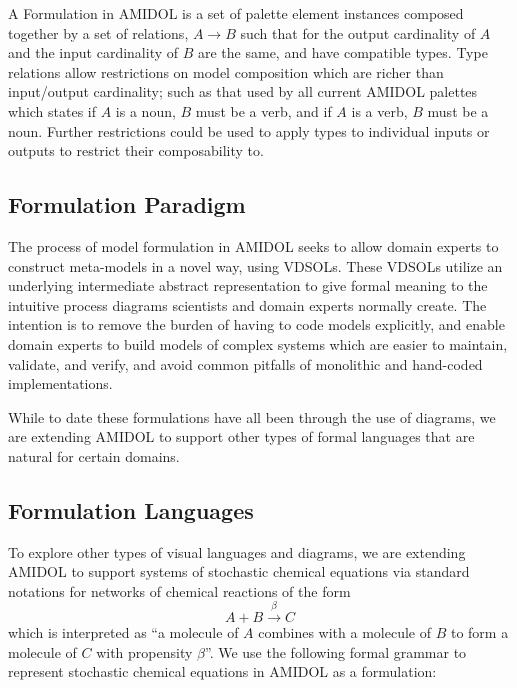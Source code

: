 \documentclass[11pt]{article}
\theoremstyle{definition}
\newcommand{\amidol}{\textsc{AMIDOL}}
\begin{document}
A Formulation in \amidol{} is a set of palette element instances
composed together by a set of relations, $A \rightarrow B$ such that
for the output cardinality of $A$ and the input cardinality of $B$ are
the same, and have compatible types.  Type relations allow
restrictions on model composition which are richer than input/output
cardinality; such as that used by all current \amidol{} palettes which
states if $A$ is a noun, $B$ must be a verb, and if $A$ is a verb, $B$
must be a noun.  Further restrictions could be used to apply types to
individual inputs or outputs to restrict their composability to.

\subsection{Formulation Paradigm}

The process of model formulation in \amidol{} seeks to allow domain
experts to construct meta-models in a novel way, using VDSOLs.  These
VDSOLs utilize an
underlying intermediate abstract representation to give formal meaning
to the intuitive process diagrams scientists and domain experts
normally create.  The intention is to remove the burden of having to
code models explicitly, and enable domain experts to build models of
complex systems which are easier to maintain, validate, and verify,
and avoid common pitfalls of monolithic and hand-coded
implementations.

While to date these formulations have all been through the use of
diagrams, we are extending \amidol{} to support other types of formal
languages that are natural for certain domains.

\subsection{Formulation Languages}

To explore other types of visual languages and diagrams, we are
extending \amidol{} to support systems of stochastic chemical
equations via standard notations for networks of chemical reactions of
the form \[A +B \overset{\beta}{\rightarrow} C\] which is interpreted
as ``a molecule of $A$ combines with a molecule of $B$ to form a
molecule of $C$ with propensity $\beta$''.  We use the following
formal grammar to represent stochastic chemical equations in \amidol{}
as a formulation:


\end{document}
